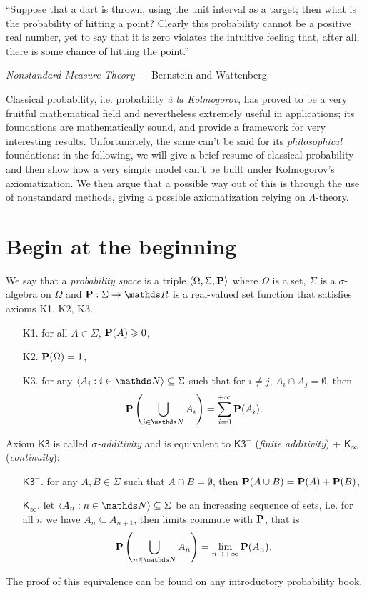 \documentclass[draft.tex]{subfiles}
\begin{document}
\epigraph{ “Suppose that a dart is thrown, using the unit interval as a target; then what is the probability of hitting a point? Clearly this probability cannot be a positive real number, yet to say that it is zero violates the intuitive feeling that, after all, there is some chance of hitting the point.”}{\textit{Nonstandard Measure Theory} --- Bernstein and Wattenberg}

	Classical probability, i.e. probability \textit{à la Kolmogorov}, has proved to be a very fruitful mathematical field and nevertheless extremely useful in applications; its foundations are mathematically sound, and provide a framework for very interesting results. Unfortunately, the same can't be said for its \textit{philosophical} foundations: in the following, we will give a brief resume of classical probability and then show how a very simple model can't be built under Kolmogorov's axiomatization. We then argue that a possible way out of this is through the use of nonstandard methods, giving a possible axiomatization relying on $\Lambda$-theory.
\section{Begin at the beginning}
	We say that a \emph{probability space} is a triple $\langle \Omega, \Sigma, \textbf{P}\rangle$ where $\Omega$ is a set, $\Sigma$ is a $\sigma$-algebra on $\Omega$ and $\prob: \Sigma \to \RR$ is a real-valued set function that satisfies axioms \textsf{K1}, \textsf{K2}, \textsf{K3}.
	\begin{itemize}
		\item[\textsf{K1}.] for all $A \in \Sigma$, $ \textbf{P}(A) \geqslant 0$,
		\item[\textsf{K2}.] $ \textbf{P}(\Omega) = 1$,
		\item[\textsf{K3}.] for any $\langle A_i: i \in \NN\rangle \subseteq \Sigma$ such that for $i \neq j$, $A_i \cap A_j = \emptyset$, then
			\begin{equation*}
				\prob\left(\bigcup\limits_{i \in \NN} A_i\right) = \sum\limits_{i=0}^{+\infty} \prob(A_i).
			\end{equation*}
	\end{itemize}
	Axiom $\textsf{K3}$ is called \emph{$\sigma$-additivity} and is equivalent to $\textsf{K3}^{-}$ (\emph{finite additivity}) + $\textsf{K}_{\infty}$ (\emph{continuity}):
	\begin{itemize}
		\item[$\textsf{K3}^{-}$.] for any $A, B \in \Sigma$ such that $A \cap B = \emptyset$, then $\textbf{P}(A\cup B) = \textbf{P}(A) + \textbf{P}(B)$,
		\item[$\textsf{K}_{\infty}$.] let $\langle A_n: n \in \NN\rangle \subseteq \Sigma$ be an increasing sequence of sets, i.e. for all $n$ we have $A_{n} \subseteq A_{n+1}$, then limits commute with $\textbf{P}$, that is
			\begin{equation*}
				\prob\left(\bigcup\limits_{n \in \NN}A_n\right) = \lim\limits_{n \to +\infty} \prob(A_n).
			\end{equation*}
	\end{itemize}
	The proof of this equivalence can be found on any introductory probability book.
\end{document}
